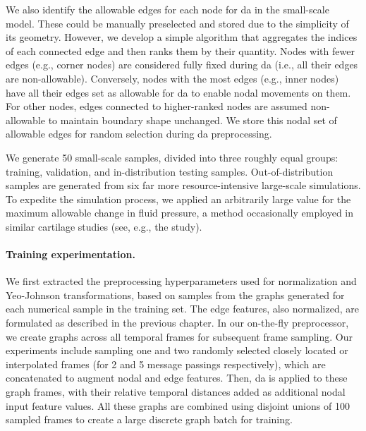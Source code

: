 \documentclass[12pt,a4paper]{report}
\begin{document}
We also identify the allowable edges for each node for \ac{da} in the small-scale model. These could be manually preselected and stored due to the simplicity of its geometry. However, we develop a simple algorithm that aggregates the indices of each connected edge and then ranks them by their quantity. Nodes with fewer edges (e.g., corner nodes) are considered fully fixed during \ac{da} (i.e., all their edges are non-allowable). Conversely, nodes with the most edges (e.g., inner nodes) have all their edges set as allowable for \ac{da} to enable nodal movements on them. For other nodes, edges connected to higher-ranked nodes are assumed non-allowable to maintain boundary shape unchanged. We store this nodal set of allowable edges for random selection during \ac{da} preprocessing.

We generate 50 small-scale samples, divided into three roughly equal groups: training, validation, and in-distribution testing samples. Out-of-distribution samples are generated from six far more resource-intensive large-scale simulations. To expedite the simulation process, we applied an arbitrarily large value for the maximum allowable change in fluid pressure, a method occasionally employed in similar cartilage studies (see, e.g., the \cite{mononen2023} study).

\paragraph{Training experimentation.} We first extracted the preprocessing hyperparameters used for normalization and Yeo-Johnson transformations, based on samples from the graphs generated for each numerical sample in the training set. The edge features, also normalized, are formulated as described in the previous chapter. In our on-the-fly preprocessor, we create graphs across all temporal frames for subsequent frame sampling. Our experiments include sampling one and two randomly selected closely located or interpolated frames (for 2 and 5 message passings respectively), which are concatenated to augment nodal and edge features. Then, \ac{da} is applied to these graph frames, with their relative temporal distances added as additional nodal input feature values. All these graphs are combined using disjoint unions of 100 sampled frames to create a large discrete graph batch for training.
\end{document}
